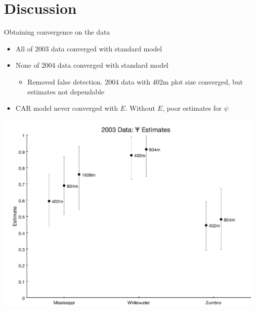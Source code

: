 \documentclass{beamer}
\begin{document}
\section{Discussion}
\begin{frame}{Obtaining convergence on the data}
	\begin{itemize}
		\item All of 2003 data converged with standard model
		\item None of 2004 data converged with standard model
		\begin{itemize}
			\item Removed false detection. 2004 data with 402m plot size
			converged, but estimates not dependable
		\end{itemize}
		\item CAR model never converged with $E$. Without $E$, poor
		estimates for $\psi$
	\end{itemize}
\end{frame}

\begin{frame}{}
	\begin{center}
		\includegraphics[scale=0.8]{Figures/Graphs/2003Psi.pdf}
	\end{center}
\end{frame}

\end{document}
